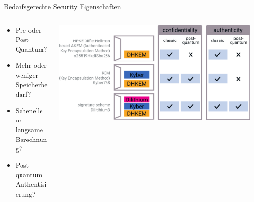 \begin{frame}[c]{Bedarfsgerechte Security Eigenschaften}
  \begin{columns}[fullwidth,c]
    \begin{column}{.35\linewidth}
      \begin{itemize}
        \item Pre oder Post-Quantum?
        \item Mehr oder weniger Speicherbedarf?
        \item Schenelle or langsame Berechnung?
        \item Post-quantum Authentisierung? 
      \end{itemize}
    \end{column}%
    \begin{column}{.65\linewidth}
      \includegraphics[width=\linewidth]{graphics/hpke variants}
    \end{column}
  \end{columns}
\end{frame}


